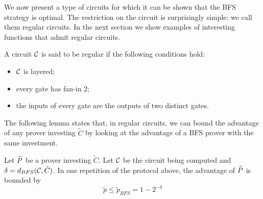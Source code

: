 We now present a type of circuits for which it can be shown that the BFS strategy is optimal. The restriction on the circuit is surprisingly simple: we call them 
{\sf regular circuits}. In 
the next section we show examples of interesting functions that admit regular circuits. 

\begin{mydef}
\label{def:reg-circ}
	A circuit $\cal C$ is said to be regular if the following conditions hold:
	\begin{itemize}
		\item $\cal C$ is layered;
		\item every gate has fan-in 2;
		\item the inputs of every gate are the outputs of two distinct gates.
	\end{itemize}
\end{mydef}

The following lemma states that, in regular circuits, we can bound the advantage of any prover investing $\tilde{C}$ by looking at the advantage of a BFS prover with the same investment.

\begin{mylemma}
	\label{lemma:bfs-bound-reg}
	Let $\widetilde{P}$ be a prover investing $\tilde{C}$. Let $\cal C$ be the circuit being computed and $\delta=d_{BFS}({\cal C},\tilde{C})$. In one repetition of the  		protocol above, the advantage of $\widetilde{P}$ is bounded by 
	$$ \tilde{p} \leq \tilde{p}_{BFS} = 1 - 2^{-\delta}$$ 
\end{mylemma}

